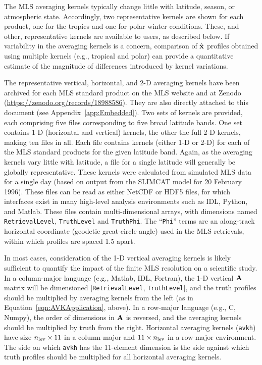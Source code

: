 The MLS averaging kernels typically change little with latitude, season, or atmospheric state. Accordingly, two representative kernels are shown for each product, one for the tropics and one for polar winter conditions. These, and other, representative kernels are available to users, as described below. If variability in the averaging kernels is a concern, comparison of $\hat{\mathbf{x}}$ profiles obtained using multiple kernels (e.g., tropical and polar) can provide a quantitative estimate of the magnitude of differences introduced by kernel variations.

The representative vertical, horizontal, and \mbox{2-D} averaging kernels have been archived for each MLS standard product on the MLS website and at Zenodo (\url{https://zenodo.org/records/18988586}). They are also directly attached to this document (see Appendix~\ref{app:Embedded}). Two sets of kernels are provided, each comprising five files corresponding to five broad latitude bands. One set contains \mbox{1-D} (horizontal and vertical) kernels, the other the full \mbox{2-D} kernels, making ten files in all. Each file contains kernels (either \mbox{1-D} or \mbox{2-D}) for each of the MLS standard products for the given latitude band. Again, as the averaging kernels vary little with latitude, a file for a single latitude will generally be globally representative. These kernels were calculated from simulated MLS data for a single day (based on output from the SLIMCAT model for 20 February 1996). These files can be read as either NetCDF or HDF5 files, for which interfaces exist in many high-level analysis environments such as IDL, Python, and Matlab. These files contain multi-dimensional arrays, with dimensions named \texttt{RetrievalLevel}, \texttt{TruthLevel} and \texttt{TruthPhi}. The ``\texttt{Phi}'' terms are an along-track horizontal coordinate (geodetic great-circle angle) used in the MLS retrievals, within which profiles are spaced 1.5\degsym{} apart.

In most cases, consideration of the \mbox{1-D} vertical averaging kernels is likely sufficient to quantify the impact of the finite MLS resolution on a scientific study. In a column-major language (e.g., Matlab, IDL, Fortran), the \mbox{1-D} vertical $\mathbf{A}$ matrix will be dimensioned [\texttt{RetrievalLevel}, \texttt{TruthLevel}], and the truth profiles should be multiplied by averaging kernels from the left (as in Equation~\ref{eqn:AVKApplication}, above). In a row-major language (e.g., C, Numpy), the order of dimensions in $\mathbf{A}$ is reversed, and the averaging kernels should be multiplied by truth from the right.  Horizontal averaging kernels (\texttt{avkh}) have size $n_{\text{lev}} \times 11$ in a column-major and $11 \times n_{\text{lev}}$ in a row-major environment. The side on which \texttt{avkh} has the 11-element dimension is the side against which truth profiles should be multiplied for all horizontal averaging kernels.


